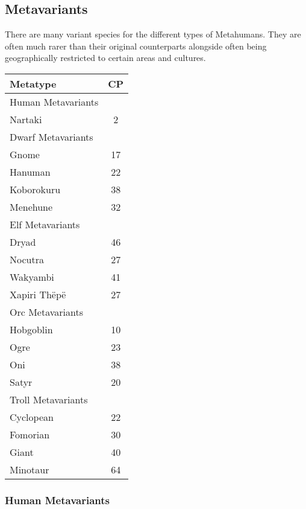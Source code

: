 \begin{multicols*}{3}
	
	\subsection{Metavariants}
	
	There are many variant species for the different types of Metahumans. They are often much rarer than their original counterparts alongside often being geographically restricted to certain areas and cultures.
	
	\begin{center}
		\begin{tabularx}{0.32\textwidth}{|X|c|}
			\hline
			Metatype & CP \\
			\hline
			\hline
			Human Metavariants & \\
			\hline
			Nartaki & 2 \\
			\hline
			\hline
			Dwarf Metavariants & \\
			\hline
			Gnome & 17 \\
			Hanuman & 22 \\
			Koborokuru & 38 \\
			Menehune & 32 \\
			\hline
			\hline
			Elf Metavariants & \\
			\hline
			Dryad & 46 \\
			Nocutra & 27 \\
			Wakyambi & 41 \\
			Xapiri Thëpë & 27 \\
			\hline
			\hline
			Orc Metavariants & \\
			\hline
			Hobgoblin & 10 \\
			Ogre & 23 \\
			Oni & 38 \\
			Satyr & 20 \\
			\hline
			\hline
			Troll Metavariants & \\
			\hline
			Cyclopean & 22 \\
			Fomorian & 30 \\
			Giant & 40 \\
			Minotaur & 64 \\
			\hline
		\end{tabularx}
	\end{center}
	
	\subsubsection{Human Metavariants}
	

\end{multicols*}
